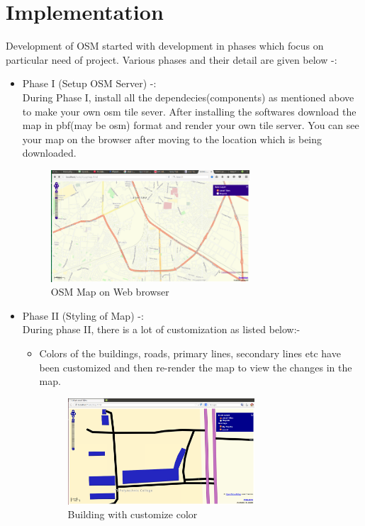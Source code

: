\section{Implementation}
Development of OSM started with development in phases which focus on particular need of project.
Various phases and their detail are given below -:
\begin{itemize}
\item Phase I (Setup OSM Server) -: \\
        During Phase I, install all the dependecies(components) as mentioned above to make your own osm tile sever. After installing the softwares download the map in pbf(may be osm) format and render your own tile server. You can see your map on the browser after moving to the location which is being downloaded.

\begin{figure}[h!]
\centering \includegraphics[width=0.7\textwidth]{input/images/osm7.png}
\caption{OSM Map on Web browser}
\end{figure}

\item Phase II (Styling of Map) -: \\
        During phase II, there is a lot of customization as listed below:-
\begin{itemize}
\item Colors of the buildings, roads, primary lines, secondary lines etc have been customized and then re-render the map to view the changes in the map.
\begin{figure}[h!]
\centering \includegraphics[width=0.7\textwidth]{input/images/osm5.png}
\caption{Building with customize color}
\end{figure}


\end{itemize}
\end{itemize}
